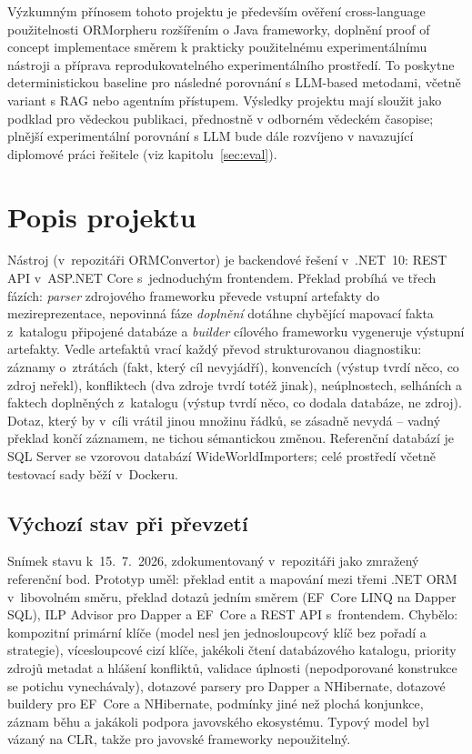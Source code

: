 \documentclass{article}
\begin{document}
Výzkumným přínosem tohoto projektu je především ověření cross-language použitelnosti ORMorpheru rozšířením o Java frameworky, doplnění proof of concept implementace směrem k prakticky použitelnému experimentálnímu nástroji a příprava reprodukovatelného experimentálního prostředí. To poskytne deterministickou baseline pro následné porovnání s LLM-based metodami, včetně variant s RAG nebo agentním přístupem. Výsledky projektu mají sloužit jako podklad pro vědeckou publikaci, přednostně v odborném vědeckém časopise; plnější experimentální porovnání s LLM bude dále rozvíjeno v navazující diplomové práci řešitele (viz kapitolu~\ref{sec:eval}).

\section{Popis projektu}\label{sec:popis}

Nástroj (v~repozitáři ORMConvertor) je backendové řešení v~.NET~10: REST API v~ASP.NET Core s~jednoduchým frontendem. Překlad probíhá ve třech fázích: \emph{parser} zdrojového frameworku převede vstupní artefakty do mezireprezentace, nepovinná fáze \emph{doplnění} dotáhne chybějící mapovací fakta z~katalogu připojené databáze a \emph{builder} cílového frameworku vygeneruje výstupní artefakty. Vedle artefaktů vrací každý převod strukturovanou diagnostiku: záznamy o~ztrátách (fakt, který cíl nevyjádří), konvencích (výstup tvrdí něco, co zdroj neřekl), konfliktech (dva zdroje tvrdí totéž jinak), neúplnostech, selháních a faktech doplněných z~katalogu (výstup tvrdí něco, co dodala databáze, ne zdroj). Dotaz, který by v~cíli vrátil jinou množinu řádků, se zásadně nevydá -- vadný překlad končí záznamem, ne tichou sémantickou změnou. Referenční databází je SQL Server se vzorovou databází WideWorldImporters; celé prostředí včetně testovací sady běží v~Dockeru.

\subsection{Výchozí stav při převzetí}

Snímek stavu k~15.~7.~2026, zdokumentovaný v~repozitáři jako zmražený referenční bod. Prototyp uměl: překlad entit a mapování mezi třemi .NET ORM v~libovolném směru, překlad dotazů jedním směrem (EF~Core LINQ na Dapper SQL), ILP Advisor pro Dapper a EF~Core a REST API s~frontendem. Chybělo: kompozitní primární klíče (model nesl jen jednosloupcový klíč bez pořadí a strategie), vícesloupcové cizí klíče, jakékoli čtení databázového katalogu, priority zdrojů metadat a hlášení konfliktů, validace úplnosti (nepodporované konstrukce se potichu vynechávaly), dotazové parsery pro Dapper a NHibernate, dotazové buildery pro EF~Core a NHibernate, podmínky jiné než plochá konjunkce, záznam běhu a jakákoli podpora javovského ekosystému. Typový model byl vázaný na CLR, takže pro javovské frameworky nepoužitelný.
\end{document}
